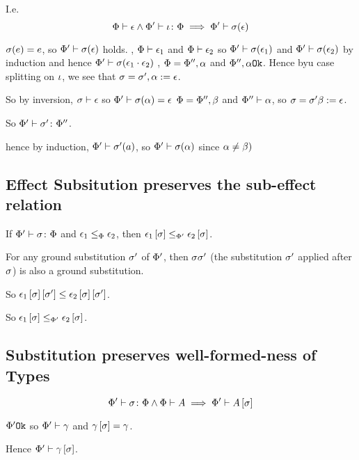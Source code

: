 {    I.e. \begin{equation}
        \wellformed{\P}{\e}\wedge\typerelation{\P'}{\i}{\P} \implies \wellformed{\P'}{\si(\e)}
    \end{equation}

    \proof
    $\si(e) = e$, so $\wellformed{\P'}{\si(\e)}$ holds.
    \bi, $\wellformed{\P}{\e_1}$ and $\wellformed{\P}{\e_2}$ so $\wellformed{\P'}{\si(\e_1)}$ and $\wellformed{\P'}{\si(\e_2)}$ by induction and hence $\wellformed{\P'}{\si(\e_1\dot\e_2)}$
    \bi, $\P=\P'',\a$ and $\ok{\P'',\a}$. Hence byu case splitting on $\i$, we see that $\si=\si', \a\setto\e$.

    So by inversion, $\wellformed{\si}{\e}$ so $\wellformed{\P'}{\si(\a)=\e}$
    \bi $\P=\P'', \b$ and $\wellformed{\P''}{\a}$, so $\si=\si'\b\setto\e$.

    So $\typerelation{\P'}{\si'}{\P''}$.

    hence by induction, $\wellformed{\P'}{\si'(a)}$, so $\wellformed{\P'}{\si(\a)}$ since $\a\neq\b)$

    \subsection{Effect Subsitution preserves the sub-effect relation}

    If $\typerelation{\P'}{\si}{\P}$ and $\e_1\subeffectp\e_2$, then $\e_1\ssi\subeffect_{\P'}\e_2\ssi$.

    \proof
    For any ground substitution $\si'$ of $\P'$, then $\si\si'$ (the substitution $\si'$ applied after $\si$) is also a ground substitution.
    
    So $\e_1\ssi\sub{\si'}\subeffect\e_2\ssi\sub{\si'}$. 
    
    So $\e_1\ssi\subeffect_{\P'}\e_2\ssi$.

    \subsection{Substitution preserves well-formed-ness of Types}
    \begin{equation}
        \typerelation{\P'}{\si}{\P} \wedge \wellformed{\P}{A} \implies \wellformed{\P'}{A\ssi}
    \end{equation}
    \proof

    $\ok{\P'}$ so $\wellformed{\P'}{\g}$ and $\g\ssi=\g$.

    Hence $\wellformed{\P'}{\g\ssi}$.

}
